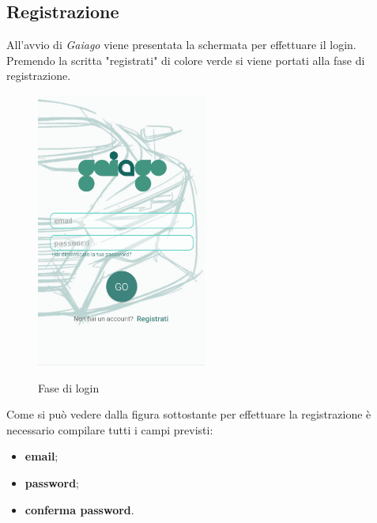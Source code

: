 \subsection{Registrazione}
All'avvio di \textit{Gaiago} viene presentata la schermata per effettuare il login. Premendo la scritta "registrati" di colore verde si viene portati alla fase di registrazione.
\begin{figure}[H] 
	\centering 
	\includegraphics[width=0.5\textwidth]{res/images/login.png}\\
	\caption{Fase di login}
	\label{Login}
\end{figure}
 \pagebreak
Come si può vedere dalla figura sottostante per effettuare la registrazione è necessario compilare tutti i campi previsti:
\begin{itemize}
	\item \textbf{email};
	\item \textbf{password};
	\item \textbf{conferma password}.
\end{itemize} 

